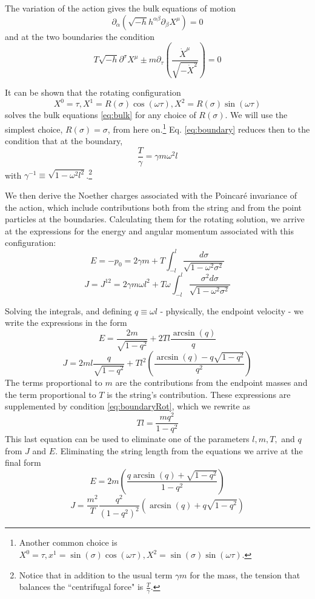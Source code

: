 \documentclass[11pt,a4]{article}
\def\be{\begin{equation}}
\def\ee{\end{equation}}
\newcommand{\del}{\partial}
\begin{document}
		The variation of the action gives the bulk equations of motion
		\be \del_\alpha\left(\sqrt{-h}h^{\alpha\beta}\del_\beta X^\mu\right) = 0 \label{eq:bulk} \ee
		and at the two boundaries the condition
		\be T\sqrt{-h}\del^\sigma X^\mu \pm m\del_\tau\left(\frac{\dot{X}^\mu}{\sqrt{-\dot{X}^2}}\right) = 0 \label{eq:boundary} \ee
		
		It can be shown that the rotating configuration
		\be X^0 = \tau, X^1 = R(\sigma)\cos(\omega\tau), X^2 = R(\sigma)\sin(\omega\tau) \ee
		solves the bulk equations \eqref{eq:bulk} for any choice of \(R(\sigma)\). We will use the simplest choice, \(R(\sigma) = \sigma\), from here on.\footnote{Another common choice is $X^0=\tau, x^1=\sin(\sigma) \cos(\omega\tau), X^2= \sin(\sigma)\sin(\omega\tau)$.} Eq. \eqref{eq:boundary} reduces then to the condition that at the boundary,
		\be \frac{T}{\gamma} = \gamma m \omega^2 l \label{eq:boundaryRot}\ee
		with \(\gamma^{-1} \equiv \sqrt{1-\omega^2 l^2}\).\footnote{Notice that in addition to the usual term $\gamma m$ for the mass, the tension that balances the ``centrifugal force" is $\frac{T}{\gamma}$.}

		We then derive the Noether charges associated with the Poincar\'e invariance of the action, which include contributions both from the string and from the point particles at the boundaries. Calculating them for the rotating solution, we arrive at the expressions for the energy and angular momentum associated with this configuration:
	\be	E = -p_0 = 2\gamma m + T \int_{-l}^l\!\frac{d\sigma}{\sqrt{1-\omega^2\sigma^2}} \ee
	\be J = J^{12} = 2\gamma m \omega l^2 + T \omega \int_{-l}^l\! \frac{\sigma^2 d\sigma}{\sqrt{1-\omega^2\sigma^2}} \ee

		Solving the integrals, and defining \(q \equiv \omega l\) - physically, the endpoint velocity - we write the expressions in the form
		\be E = \frac{2m}{\sqrt{1-q^2}} + 2Tl\frac{\arcsin(q)}{q} \ee
		\be J = 2m l \frac{q}{\sqrt{1-q^2}} + Tl^2\left(\frac{\arcsin(q)-q\sqrt{1-q^2}}{q^2}\right) \ee
		The terms proportional to \(m\) are the contributions from the endpoint masses and the term proportional to \(T\) is the string's contribution. These expressions are supplemented by condition \eqref{eq:boundaryRot}, which we rewrite as
		\be Tl = \frac{mq^2}{1-q^2} \label{eq:Tm}\ee
		This last equation can be used to eliminate one of the parameters \(l, m , T,\) and \(q\) from \(J\) and \(E\). Eliminating the string length from the equations we arrive at the final form
		\be E = 2m \left(\frac{q\arcsin(q)+\sqrt{1-q^2}}{1-q^2}\right) \label{eq:massiveE} \ee
		\be J = \frac{m^2}{T}\frac{q^2}{(1-q^2)^2}\left(\arcsin(q)+q\sqrt{1-q^2}\right) \label{eq:massiveJ} \ee
\end{document}

